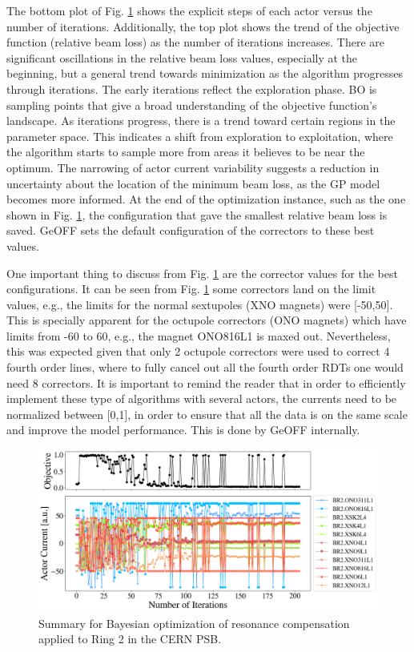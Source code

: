 The bottom plot of Fig. \ref{fig:bo1} shows the explicit steps of each actor versus the number of iterations. Additionally, the top plot shows the trend of the objective function (relative beam loss) as the number of iterations increases. There are significant oscillations in the relative beam loss values, especially at the beginning, but a general trend towards minimization as the algorithm progresses through iterations. The early iterations reflect the exploration phase. BO is sampling points that give a broad understanding of the objective function's landscape. As iterations progress, there is a trend toward certain regions in the parameter space. This indicates a shift from exploration to exploitation, where the algorithm starts to sample more from areas it believes to be near the optimum. The narrowing of actor current variability suggests a reduction in uncertainty about the location of the minimum beam loss, as the GP model becomes more informed. At the end of the optimization instance, such as the one shown in Fig. \ref{fig:bo1}, the configuration that gave the smallest relative beam loss is saved. GeOFF sets the default configuration of the correctors to these best values. 

One important thing to discuss from Fig. \ref{fig:bo1} are the corrector values for the best configurations. It can be seen from Fig. \ref{fig:bo1} some correctors land on the limit values, e.g., the limits for the normal sextupoles (XNO magnets) were [-50,50]. This is specially apparent for the octupole correctors (ONO magnets) which have limits from -60 to 60, e.g., the magnet ONO816L1 is maxed out. Nevertheless, this was expected given that only 2 octupole correctors were used to correct 4 fourth order lines, where to fully cancel out all the fourth order RDTs one would need 8 correctors. It is important to remind the reader that in order to efficiently implement these type of algorithms with several actors, the currents need to be normalized between [0,1], in order to ensure that all the data is on the same scale and improve the model performance. This is done by GeOFF internally.    

\begin{figure}[H]
    \centering
    \includegraphics[width=\linewidth]{chapter5/2023_05_02_R2_LHCramp_BayesOpt.png}
    \caption{Summary for Bayesian optimization of resonance compensation applied to Ring 2 in the CERN PSB.}
    \label{fig:bo1}
\end{figure}

